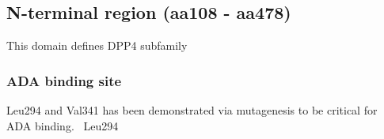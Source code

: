 \subsection{N-terminal region (aa108 - aa478)}

This domain defines DPP4 subfamily

\subsubsection{ADA binding site}
Leu294 and Val341 has been demonstrated via mutagenesis to be critical for ADA binding.~\cite{Abbott_1999} Leu294 